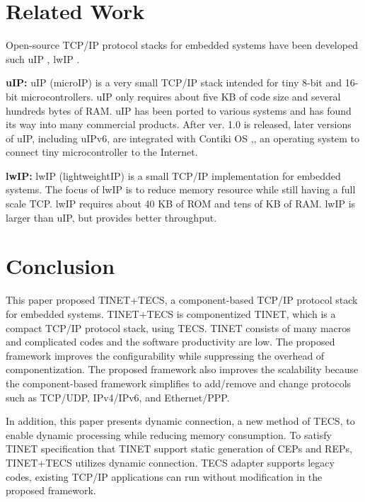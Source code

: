 \documentclass[conference]{IEEEtran/IEEEtran}
\begin{document}
\section{Related Work}
\label{sec:Related Work}

Open-source TCP/IP protocol stacks for embedded systems have been developed such uIP \cite{par:uIP}, lwIP \cite{par:lwIP}.

{\bf uIP:}
uIP (microIP) is a very small TCP/IP stack intended for tiny 8-bit and 16-bit microcontrollers.
    uIP only requires about five KB of code size and several hundreds bytes of RAM.
uIP has been ported to various systems and has found its way into many commercial products.
After ver. 1.0 is released, later versions of uIP, including uIPv6, are integrated with Contiki OS \cite{par:Contiki},\cite{url:Contiki}, an operating system to connect tiny microcontroller to the Internet.

{\bf lwIP:}
lwIP (lightweightIP) is a small TCP/IP implementation for embedded systems.
The focus of lwIP is to reduce memory resource while still having a full scale TCP.
lwIP requires about 40 KB of ROM and tens of KB of RAM.
lwIP is larger than uIP, but provides better throughput.


\section{Conclusion}
\label{sec:Conclusion}

This paper proposed TINET+TECS, a component-based TCP/IP protocol stack for embedded systems.
TINET+TECS is componentized TINET, which is a compact TCP/IP protocol stack, using TECS.
TINET consists of many macros and complicated codes and the software productivity are low.
The proposed framework improves the configurability while suppressing the overhead of componentization.
The proposed framework also improves the scalability because the component-based framework simplifies to add/remove and change protocols such as TCP/UDP, IPv4/IPv6, and Ethernet/PPP.

In addition, this paper presents dynamic connection, a new method of TECS, to enable dynamic processing while reducing memory consumption.
To satisfy TINET specification that TINET support static generation of CEPs and REPs, TINET+TECS utilizes dynamic connection.
TECS adapter supports legacy codes, existing TCP/IP applications can run without modification in the proposed framework.
\end{document}
